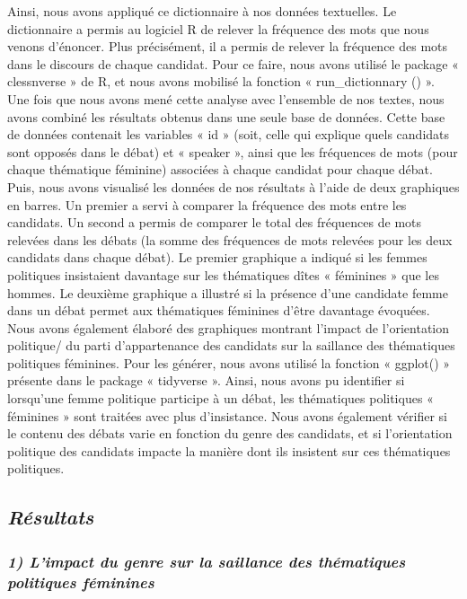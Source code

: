 \documentclass[
  letterpaper,
  DIV=11,
  numbers=noendperiod]{scrartcl}
\begin{document}
Ainsi, nous avons appliqué ce dictionnaire à nos données textuelles. Le
dictionnaire a permis au logiciel R de relever la fréquence des mots que
nous venons d'énoncer. Plus précisément, il a permis de relever la
fréquence des mots dans le discours de chaque candidat. Pour ce faire,
nous avons utilisé le package « clessnverse » de R, et nous avons
mobilisé la fonction « run\_dictionnary () ». Une fois que nous avons
mené cette analyse avec l'ensemble de nos textes, nous avons combiné les
résultats obtenus dans une seule base de données. Cette base de données
contenait les variables « id » (soit, celle qui explique quels candidats
sont opposés dans le débat) et « speaker », ainsi que les fréquences de
mots (pour chaque thématique féminine) associées à chaque candidat pour
chaque débat. Puis, nous avons visualisé les données de nos résultats à
l'aide de deux graphiques en barres. Un premier a servi à comparer la
fréquence des mots entre les candidats. Un second a permis de comparer
le total des fréquences de mots relevées dans les débats (la somme des
fréquences de mots relevées pour les deux candidats dans chaque débat).
Le premier graphique a indiqué si les femmes politiques insistaient
davantage sur les thématiques dîtes « féminines » que les hommes. Le
deuxième graphique a illustré si la présence d'une candidate femme dans
un débat permet aux thématiques féminines d'être davantage évoquées.
Nous avons également élaboré des graphiques montrant l'impact de
l'orientation politique/ du parti d'appartenance des candidats sur la
saillance des thématiques politiques féminines. Pour les générer, nous
avons utilisé la fonction « ggplot() » présente dans le package «
tidyverse ». Ainsi, nous avons pu identifier si lorsqu'une femme
politique participe à un débat, les thématiques politiques « féminines »
sont traitées avec plus d'insistance. Nous avons également vérifier si
le contenu des débats varie en fonction du genre des candidats, et si
l'orientation politique des candidats impacte la manière dont ils
insistent sur ces thématiques politiques.

\hypertarget{ruxe9sultats}{%
\subsection{\texorpdfstring{\emph{Résultats}}{Résultats}}\label{ruxe9sultats}}

\hypertarget{limpact-du-genre-sur-la-saillance-des-thuxe9matiques-politiques-fuxe9minines}{%
\subsubsection{\texorpdfstring{\emph{1) L'impact du genre sur la
saillance des thématiques politiques
féminines}}{1) L'impact du genre sur la saillance des thématiques politiques féminines}}\label{limpact-du-genre-sur-la-saillance-des-thuxe9matiques-politiques-fuxe9minines}}
\end{document}
